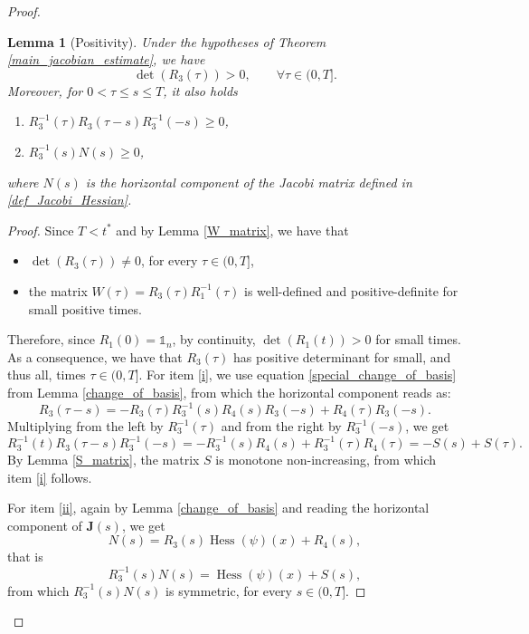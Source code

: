 \documentclass[reqno]{amsart}
\DeclareMathOperator{\Hess}{Hess}
\theoremstyle{plain}
\newtheorem{lem}[thm]{Lemma}
\theoremstyle{definition}
\theoremstyle{remark}
\begin{document}
\begin{proof}
		\begin{lem}[Positivity]\label{positivity_Jacobi}
			Under the hypotheses of Theorem \ref{main_jacobian_estimate}, we have
			\begin{equation}
				\det(R_3(\tau))>0,\qquad\forall \tau\in(0,T].
			\end{equation}
			Moreover, for $0<\tau\leq s\leq T$, it also holds
			\begin{enumerate}
				\item\label{i} $R_3^{-1}(\tau)R_3(\tau-s)R_3^{-1}(-s)\geq 0$,
				\item\label{ii} $R_3^{-1}(s)N(s)\geq 0$,
			\end{enumerate}	
			where $N(s)$ is the horizontal component of the Jacobi matrix defined in \eqref{def_Jacobi_Hessian}.	
		\end{lem}
		\begin{proof}
			Since $T<t^*$ and by Lemma \ref{W_matrix}, we have that
			\begin{itemize}
				\item $\det(R_3(\tau))\neq 0$, for every $\tau\in(0,T]$,
				\item the matrix $W(\tau)=R_3(\tau)R_1^{-1}(\tau)$ is well-defined and positive-definite for small positive times.
			\end{itemize}
			Therefore, since $R_1(0)=\mathbb{1}_n$, by continuity, $\det(R_1(t))>0$ for small times. As a consequence, we have that $R_3(\tau)$ has positive determinant for small, and thus all, times $\tau\in(0,T]$.
			For item \eqref{i}, we use equation \eqref{special_change_of_basis} from Lemma \ref{change_of_basis}, from which the horizontal component reads as:
			\begin{equation}
				R_3(\tau-s)=-R_3(\tau)R_3^{-1}(s)R_4(s)R_3(-s)+R_4(\tau)R_3(-s).
			\end{equation}
			Multiplying from the left by $R_3^{-1}(\tau)$ and from the right by $R_3^{-1}(-s)$, we get
			\begin{equation}
				R_3^{-1}(t)R_3(\tau-s)R_3^{-1}(-s)=-R_3^{-1}(s)R_4(s)+R_3^{-1}(\tau)R_4(\tau)=-S(s)+S(\tau).
			\end{equation} 
			By Lemma \ref{S_matrix}, the matrix $S$ is monotone non-increasing, from which item \eqref{i} follows.
			
			For item \eqref{ii}, again by Lemma \ref{change_of_basis} and reading the horizontal component of $\mathbf{J}(s)$, we get 
			\begin{equation}
				N(s)=R_3(s)\Hess(\psi)(x)+R_4(s),
			\end{equation}
			that is 
            \begin{equation}                
				R_3^{-1}(s)N(s) =\Hess(\psi)(x)+S(s),
            \end{equation}
			from which $R_3^{-1}(s)N(s)$ is symmetric, for every $s\in(0,T]$.
			

\end{proof}
\end{proof}
\end{document}
